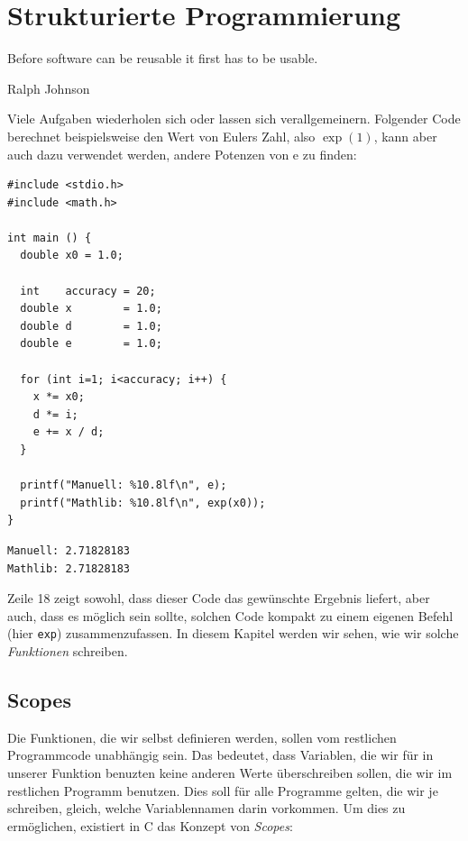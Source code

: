 \chapter{Strukturierte Programmierung} \label{chp:funcs}
\epigraph{Before software can be reusable it first has to be usable.}{Ralph Johnson}

Viele Aufgaben wiederholen sich oder lassen sich verallgemeinern. Folgender Code berechnet beispielsweise den Wert von Eulers Zahl, also $\exp(1)$, kann aber auch dazu verwendet werden, andere Potenzen von e zu finden:

\begin{codebox}
\begin{verbatim}
#include <stdio.h>
#include <math.h>

int main () {
  double x0 = 1.0;

  int    accuracy = 20;
  double x        = 1.0;
  double d        = 1.0;
  double e        = 1.0;

  for (int i=1; i<accuracy; i++) {
    x *= x0;
    d *= i;
    e += x / d;
  }

  printf("Manuell: %10.8lf\n", e);
  printf("Mathlib: %10.8lf\n", exp(x0));
}
\end{verbatim}
\end{codebox}

\begin{cmdbox}
\begin{verbatim}
Manuell: 2.71828183
Mathlib: 2.71828183
\end{verbatim}
\end{cmdbox}

Zeile 18 zeigt sowohl, dass dieser Code das gewünschte Ergebnis liefert, aber auch, dass es möglich sein sollte, solchen Code kompakt zu einem eigenen Befehl (hier \texttt{exp}) zusammenzufassen. In diesem Kapitel werden wir sehen, wie wir solche \emph{Funktionen} schreiben.

\section{Scopes} \label{sec:Scopes}
Die Funktionen, die wir selbst definieren werden, sollen vom restlichen Programmcode unabhängig sein. Das bedeutet, dass Variablen, die wir für in unserer Funktion benuzten keine anderen Werte überschreiben sollen, die wir im restlichen Programm benutzen. Dies soll für alle Programme gelten, die wir je schreiben, gleich, welche Variablennamen darin vorkommen. Um dies zu ermöglichen, existiert in C das Konzept von \emph{Scopes}:

